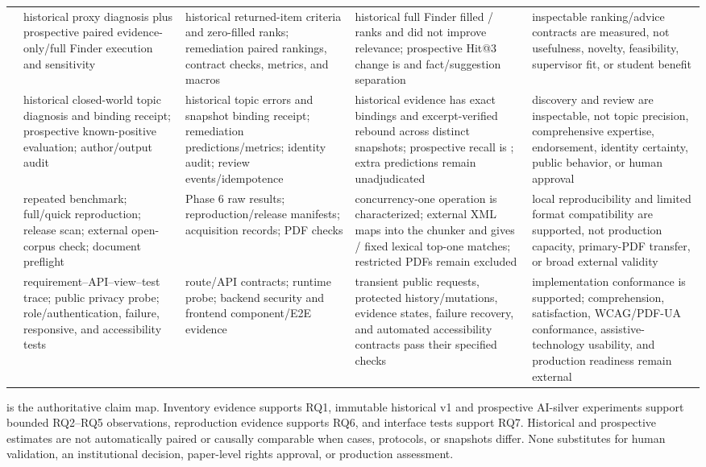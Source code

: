 \begin{longtable}{P{7mm}P{28mm}P{33mm}P{35mm}P{34mm}}
 & historical proxy diagnosis plus prospective paired evidence-only/full Finder execution and sensitivity & historical returned-item criteria and zero-filled ranks; remediation paired rankings, contract checks, metrics, and macros & historical full Finder filled \RecommendationFullReturnedCount{}/\RecommendationRequestedSlotCount{} ranks and did not improve relevance; prospective Hit@3 change is \VTwoFinderHitAtThreeDelta{} and fact/suggestion separation \VTwoFinderFactSuggestionSeparation{} & inspectable ranking/advice contracts are measured, not usefulness, novelty, feasibility, supervisor fit, or student benefit \\
 & historical closed-world topic diagnosis and binding receipt; prospective known-positive evaluation; author/output audit & historical topic errors and snapshot binding receipt; remediation predictions/metrics; identity audit; review events/idempotence & historical evidence has \TopicExactBindingCount{} exact bindings and \TopicReboundBindingCount{} excerpt-verified rebound across distinct snapshots; prospective recall is \VTwoTopicKnownPositiveRecall{}; extra predictions remain unadjudicated & discovery and review are inspectable, not topic precision, comprehensive expertise, endorsement, identity certainty, public behavior, or human approval \\
 & repeated benchmark; full/quick reproduction; release scan; external open-corpus check; document preflight & Phase 6 raw results; reproduction/release manifests; \ExternalSanityDocumentCount{} acquisition records; PDF checks & concurrency-one operation is characterized; external XML maps into the chunker and gives \ExternalSanityTopOneCount{}/\ExternalSanityDocumentCount{} fixed lexical top-one matches; restricted PDFs remain excluded & local reproducibility and limited format compatibility are supported, not production capacity, primary-PDF transfer, or broad external validity \\
 & requirement--API--view--test trace; public privacy probe; role/authentication, failure, responsive, and accessibility tests & route/API contracts; runtime probe; backend security and frontend component/E2E evidence & transient public requests, protected history/mutations, evidence states, failure recovery, and automated accessibility contracts pass their specified checks & implementation conformance is supported; comprehension, satisfaction, WCAG/PDF-UA conformance, assistive-technology usability, and production readiness remain external \\
\bottomrule
\end{longtable}
\endgroup

 is the authoritative claim map. Inventory evidence supports RQ1, immutable historical v1 and prospective AI-silver experiments support bounded RQ2--RQ5 observations, reproduction evidence supports RQ6, and interface tests support RQ7. Historical and prospective estimates are not automatically paired or causally comparable when cases, protocols, or snapshots differ. None substitutes for human validation, an institutional decision, paper-level rights approval, or production assessment.
